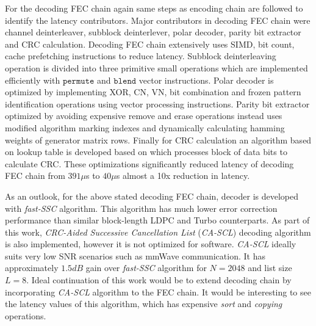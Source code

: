 For the decoding FEC chain again same steps as encoding chain are followed to identify the latency contributors. Major contributors in decoding FEC chain were channel deinterleaver, subblock deinterlever, polar decoder, parity bit extractor and CRC calculation. Decoding FEC chain extensively uses SIMD, bit count, cache prefetching instructions to reduce latency. Subblock deinterleaving operation is divided into  three primitive small operations which are implemented efficiently with $\mathtt{permute}$ and $\mathtt{blend}$ vector instructions. Polar decoder is optimized by implementing XOR, CN, VN, bit combination and frozen pattern identification operations using vector processing instructions. Parity bit extractor optimized by avoiding expensive remove and erase operations instead uses modified algorithm marking indexes and dynamically calculating hamming weights of generator matrix rows. Finally for CRC calculation an algorithm based on lookup table is developed based on \cite{Sarwate:1988:CCR:63030.63037} which processes block of data bits to calculate CRC. These optimizations significantly reduced latency of decoding FEC chain from $391 \mu$s to $40\mu$s almost a 10x reduction in latency. \newline

As an outlook, for the above stated decoding FEC chain, decoder is developed with \emph{fast-SSC} algorithm. This algorithm has much lower error correction performance than similar block-length LDPC and Turbo counterparts. As part of this work, \emph{CRC-Aided Successive Cancellation List} (\emph{CA-SCL})\cite{SCL} decoding algorithm is also implemented, however it is not optimized for software. \emph{CA-SCL} ideally suits very low SNR scenarios such as mmWave communication. It has approximately $1.5dB$ gain over \emph{fast-SSC} algorithm for $N=2048$ and list size $L = 8$. Ideal continuation of this work would be to extend decoding chain by incorporating \emph{CA-SCL} algorithm to the FEC chain. It would be interesting to see the latency values of this algorithm, which has expensive \emph{sort} and \emph{copying} operations.